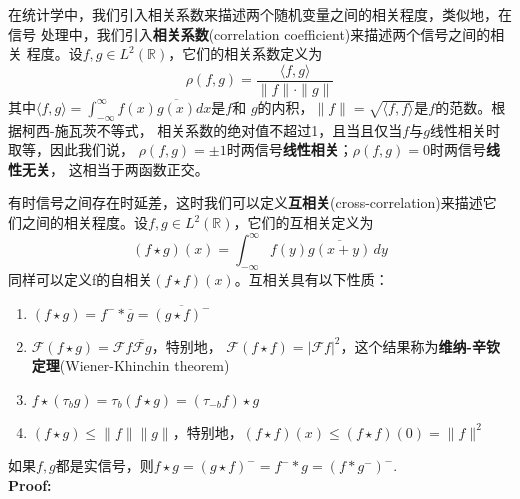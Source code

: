\documentclass{ctexbook}
\begin{document}
在统计学中，我们引入相关系数来描述两个随机变量之间的相关程度，类似地，在信号
处理中，我们引入\textbf{相关系数}(correlation coefficient)来描述两个信号之间的相关
程度。设$f,g\in L^2(\mathbb{R})$，它们的相关系数定义为
\begin{equation}
    \rho(f,g)=\frac{\langle f,g\rangle}{\|f\|\cdot\|g\|}
\end{equation}
其中$\langle f,g\rangle=\int_{-\infty}^{\infty}f(x)\overline{g(x)}dx$是$f$和
$g$的内积，$\|f\|=\sqrt{\langle f,f\rangle}$是$f$的范数。根据柯西-施瓦茨不等式，
相关系数的绝对值不超过1，且当且仅当$f$与$g$线性相关时取等，因此我们说，
$\rho(f,g)=\pm 1$时两信号\textbf{线性相关}；$\rho(f,g)=0$时两信号\textbf{线性无关}，
这相当于两函数正交。

有时信号之间存在时延差，这时我们可以定义\textbf{互相关}(cross-correlation)来描述它
们之间的相关程度。设$f,g\in L^2(\mathbb{R})$，它们的互相关定义为
\begin{equation}
    (f\star g)(x)=\int_{-\infty}^{\infty}f(y)\overline{g(x+y)}\,dy
\end{equation}
同样可以定义f的自相关$(f\star f)(x)$。互相关具有以下性质：
\begin{enumerate}
    \item $(f\star g) =f^-* \overline{g}=\overline{(g\star f)^-}$
    \item $\mathcal{F} (f\star g) =\mathcal{F} f\overline{\mathcal{F} g}$，特别地，
          $\mathcal{F} (f\star f) =|\mathcal{F} f|^2$，这个结果称为\textbf{维纳-辛钦定理}(Wiener-Khinchin theorem)
    \item $f\star (\tau_b g)=\tau_{b} (f\star g)=(\tau_{-b}f)\star g$
    \item $(f\star g)\leq\|f\|\|g\|$，特别地，$(f\star f)(x)\leq (f\star f)(0)=\|f\|^2$
\end{enumerate}
如果$f,g$都是实信号，则$f\star g = (g\star f)^- =f^- *g=(f*g^-)^-$.\\
\textbf{Proof:}
\end{document}
